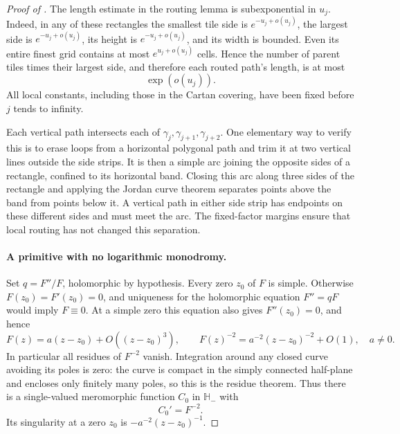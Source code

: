 \begin{proof}[Proof of ]
The length estimate in the routing lemma is subexponential in \(u_j\).
Indeed, in any of these rectangles the smallest tile side is
\(e^{-u_j+o(u_j)}\), the largest side is
\(e^{-u_j+o(u_j)}\), its height is \(e^{-u_j+o(u_j)}\), and its
width is bounded.  Even its entire finest grid contains at most
\(e^{u_j+o(u_j)}\) cells.  Hence the number of parent tiles times
their largest side, and therefore each routed path's length, is at
most
\begin{equation}
 \exp(o(u_j)).
 \label{model:mesh-path-length}
\end{equation}
All local constants, including those in the Cartan covering, have
been fixed before \(j\) tends to infinity.

Each vertical path intersects each of
\(\gamma_j,\gamma_{j+1},\gamma_{j+2}\).  One elementary way to
verify this is to erase loops from a horizontal polygonal path and
trim it at two vertical lines outside the side strips.  It is then a
simple arc joining the opposite sides of a rectangle, confined to its
horizontal band.  Closing this arc along three sides of the rectangle
and applying the Jordan curve theorem separates points above the
band from points below it.  A vertical path in either side strip has
endpoints on these different sides and must meet the arc.  The
fixed-factor margins ensure that local routing has not changed this
separation.

\paragraph{A primitive with no logarithmic monodromy.}
Set \(q=F''/F\), holomorphic by hypothesis.  Every zero \(z_0\) of
\(F\) is simple.  Otherwise \(F(z_0)=F'(z_0)=0\), and uniqueness
for the holomorphic equation \(F''=qF\) would imply \(F\equiv0\).
At a simple zero this equation also gives \(F''(z_0)=0\), and hence
\[
 F(z)=a(z-z_0)+O((z-z_0)^3),\qquad
 F(z)^{-2}=a^{-2}(z-z_0)^{-2}+O(1),\quad a\ne0.
\]
In particular all residues of \(F^{-2}\) vanish.  Integration around
any closed curve avoiding its poles is zero: the curve is compact in
the simply connected half-plane and encloses only finitely many
poles, so this is the residue theorem.  Thus there is a single-valued
meromorphic function \(C_0\) in \(\mathbb H_-\) with
\begin{equation}
 C_0'=F^{-2}.
 \label{model:mesh-primitive}
\end{equation}
Its singularity at a zero \(z_0\) is
\(-a^{-2}(z-z_0)^{-1}\).


\end{proof}
